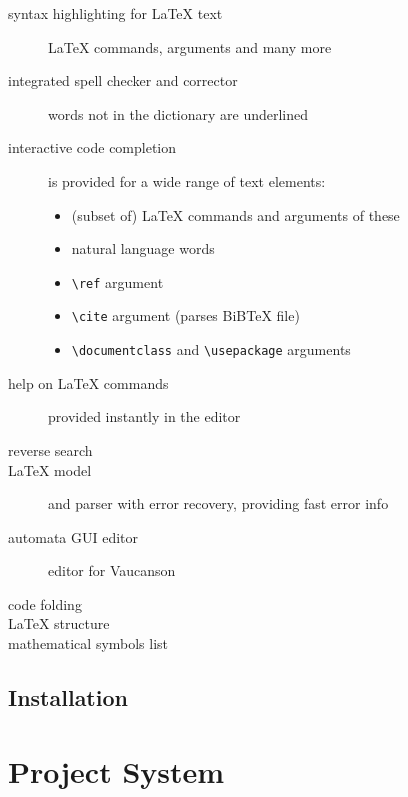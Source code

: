 \documentclass{article}
\newcommand{\lenv}{\LaTeX{} authoring environment\xspace}
\begin{document}
\begin{description}
\item[syntax highlighting for \LaTeX{} text]{\LaTeX{} commands, arguments and many more}
\item[integrated spell checker and corrector]{words not in the dictionary are underlined}
\item[interactive code completion]{is provided for a wide range of text elements:
\begin{itemize}
\item{(subset of) LaTeX{} commands and arguments of these}
\item{natural language words}
\item{\verb+\ref+ argument}
\item{\verb+\cite+ argument (parses BiBTeX file)}
\item{\verb+\documentclass+ and \verb+\usepackage+ arguments}
\end{itemize}
}
\item[help on LaTeX{} commands]{provided instantly in the editor}
\item[reverse search]{}
\item[\LaTeX{} model]{and parser with error recovery, providing fast error info}
\item[automata GUI editor]{editor for Vaucanson}
\item[code folding]{}
\item[\LaTeX{} structure]{}
\item[mathematical symbols list]{}
\end{description}

\subsection{Installation}

%


\label{ch:usage}

\section{Project System}
\end{document}
